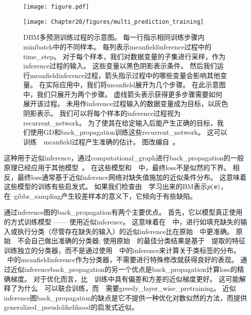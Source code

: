 \begin{figure}[!htb]
\ifOpenSource
\centerline{\texttt{[image: figure.pdf]}}
\else
\centerline{\texttt{[image: Chapter20/figures/multi\_prediction\_training]}}
\fi
\caption{\gls{DBM}多预测训练过程的示意图。
每一行指示相同训练步骤内\gls{minibatch}中的不同样本。
每列表示\gls{meanfield}\gls{inference}过程中的\gls{time_step}。
对于每个样本，我们对数据变量的子集进行采样，作为\gls{inference}过程的输入。
这些变量以黑色阴影表示条件。
然后我们运行\gls{meanfield}\gls{inference}过程，箭头指示过程中的哪些变量会影响其他变量。
在实际应用中，我们将\gls{meanfield}展开为几个步骤。
在此示意图中，我们只展开为两个步骤。
虚线箭头表示获得更多步骤需要如何展开该过程。
未用作\gls{inference}过程输入的数据变量成为目标，以灰色阴影表示。
我们可以将每个样本的\gls{inference}过程视为\gls{recurrent_network}。
为了使其在给定输入后能产生正确的目标，我们使用\gls{GD}和\gls{back_propagation}训练这些\gls{recurrent_network}。
这可以训练~~\gls{meanfield}过程产生准确的估计。
图改编自~\citet{Goodfellow-et-al-NIPS2013}。
}
\label{fig:chap20_multi_prediction_training}
\end{figure}

这种用于近似\gls{inference}，通过\gls{computational_graph}进行\gls{back_propagation}的一般原理已经应用于其他模型~\citep{Stoyanov2011,brakel13a}。
在这些模型和~~中，最终\gls{loss}不是似然的下界。
相反，最终\gls{loss}通常基于近似\gls{inference}网络对缺失值施加的近似条件分布。
这意味着这些模型的训练有些启发式。
如果我们检查由~~学习出来的\gls{BM}表示$p(\boldsymbol{\mathit{v}})$，在~\gls{gibbs_sampling}产生较差样本的意义下，它倾向于有些缺陷。

通过\gls{inference}图的\gls{back_propagation}有两个主要优点。
首先，它以模型真正使用的方式训练模型 —— 使用近似\gls{inference}。
这意味着在~~中，进行如填充缺失的输入或执行分类（尽管存在缺失的输入）的近似\gls{inference}比在原始~~中更准确。
原始~~不会自己做出准确的分类器; 使用原始~~的最佳分类结果是基于~~提取的特征训练独立的分类器，而不是通过使用~~中的\gls{inference}来计算关于类标签的分布。
~中的\gls{meanfield}\gls{inference}作为分类器，不需要进行特殊修改就获得良好的表现。
通过近似\gls{inference}\gls{back_propagation}的另一个优点是\gls{back_propagation}计算\gls{loss}的精确梯度。
对于优化而言，比~~训练中具有偏差和方差的近似梯度更好。
这可能解释了为什么~~可以联合训练，而~~需要\gls{greedy_layer_wise_pretraining}。
近似\gls{inference}图\gls{back_propagation}的缺点是它不提供一种优化对数似然的方法，而提供\gls{generalized_pseudolikelihood}的启发式近似。

